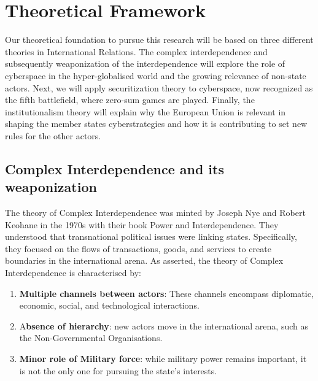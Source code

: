 \chapter{Theoretical Framework}

Our theoretical foundation to pursue this research will be based on three different theories in International Relations. The complex interdependence and subsequently weaponization of the interdependence will explore the role of cyberspace in the hyper-globalised world and the growing relevance of non-state actors. Next, we will apply securitization theory to cyberspace, now recognized as the fifth battlefield, where zero-sum games are played. Finally, the institutionalism theory will explain why the European Union is relevant in shaping the member states cyberstrategies and how it is contributing to set new rules for the other actors. 

\section{Complex Interdependence and its weaponization}

The theory of Complex Interdependence was minted by Joseph Nye and Robert Keohane in the 1970s with their book Power and Interdependence. They understood that transnational political issues were linking states. Specifically, they focused on the flows of transactions, goods, and services to create boundaries in the international arena. As \textcite{nye_1971_transnational} asserted, the theory of Complex Interdependence is characterised by:

\begin{enumerate}
    \item \textbf{Multiple channels between actors}: These channels encompass diplomatic, economic, social, and technological interactions.
    \item A\textbf{bsence of hierarchy}: new actors move in the international arena, such as the Non-Governmental Organisations. 
    \item \textbf{Minor role of Military force}: while military power remains important, it is not the only one for pursuing the state’s interests. 

\end{enumerate}

